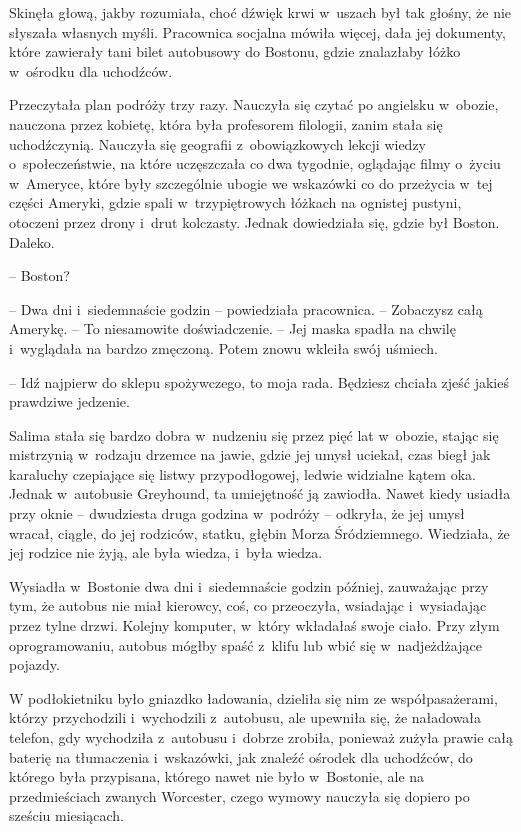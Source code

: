 \documentclass[oneside,polish,11pt,sfheadings]{mwbk}
\begin{document}
Skinęła głową, jakby rozumiała, choć dźwięk krwi w~uszach był tak
głośny, że nie słyszała własnych myśli. Pracownica socjalna mówiła
więcej, dała jej dokumenty, które zawierały tani bilet autobusowy do
Bostonu, gdzie znalazłaby łóżko w~ośrodku dla uchodźców.

Przeczytała plan podróży trzy razy. Nauczyła się czytać po angielsku w~obozie, nauczona przez kobietę, która była profesorem filologii, zanim
stała się uchodźczynią. Nauczyła się geografii z~obowiązkowych lekcji
wiedzy o~społeczeństwie, na które uczęszczała co dwa tygodnie, oglądając
filmy o~życiu w~Ameryce, które były szczególnie ubogie we wskazówki co
do przeżycia w~tej części Ameryki, gdzie spali w~trzypiętrowych łóżkach
na ognistej pustyni, otoczeni przez drony i~drut kolczasty. Jednak
dowiedziała się, gdzie był Boston. Daleko.

-- Boston?

-- Dwa dni i~siedemnaście godzin -- powiedziała pracownica. -- Zobaczysz
całą Amerykę. -- To niesamowite doświadczenie. -- Jej maska spadła na
chwilę i~wyglądała na bardzo zmęczoną. Potem znowu wkleiła swój uśmiech.

-- Idź najpierw do sklepu spożywczego, to moja rada. Będziesz chciała
zjeść jakieś prawdziwe jedzenie.

Salima stała się bardzo dobra w~nudzeniu się przez pięć lat w~obozie,
stając się mistrzynią w~rodzaju drzemce na jawie, gdzie jej umysł
uciekał, czas biegł jak karaluchy czepiające się listwy przypodłogowej,
ledwie widzialne kątem oka. Jednak w~autobusie Greyhound, ta umiejętność
ją zawiodła. Nawet kiedy usiadła przy oknie -- dwudziesta druga godzina w~podróży -- odkryła, że jej umysł wracał, ciągle, do jej rodziców, statku,
głębin Morza Śródziemnego. Wiedziała, że jej rodzice nie żyją, ale była
wiedza, i~była wiedza.

Wysiadła w~Bostonie dwa dni i~siedemnaście godzin później, zauważając
przy tym, że autobus nie miał kierowcy, coś, co przeoczyła, wsiadając i~wysiadając przez tylne drzwi. Kolejny komputer, w~który wkładałaś swoje
ciało. Przy złym oprogramowaniu, autobus mógłby spaść z~klifu lub wbić
się w~nadjeżdżające pojazdy.

W podłokietniku było gniazdko ładowania, dzieliła się nim ze
współpasażerami, którzy przychodzili i~wychodzili z~autobusu, ale
upewniła się, że naładowała telefon, gdy wychodziła z~autobusu i~dobrze
zrobiła, ponieważ zużyła prawie całą baterię na tłumaczenia i~wskazówki,
jak znaleźć ośrodek dla uchodźców, do którego była przypisana, którego
nawet nie było w~Bostonie, ale na przedmieściach zwanych Worcester,
czego wymowy nauczyła się dopiero po sześciu miesiącach.
\end{document}
